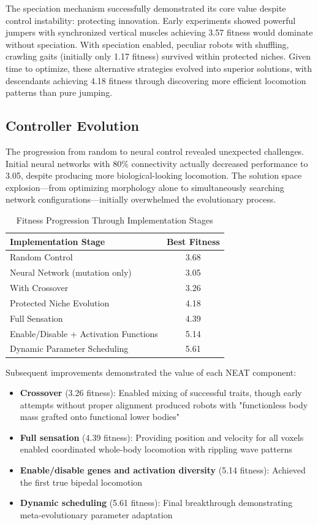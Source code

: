 \documentclass[conference]{IEEEtran}
\begin{document}
The speciation mechanism successfully demonstrated its core value despite control instability: protecting innovation. Early experiments showed powerful jumpers with synchronized vertical muscles achieving 3.57 fitness would dominate without speciation. With speciation enabled, peculiar robots with shuffling, crawling gaits (initially only 1.17 fitness) survived within protected niches. Given time to optimize, these alternative strategies evolved into superior solutions, with descendants achieving 4.18 fitness through discovering more efficient locomotion patterns than pure jumping.

\subsection{Controller Evolution}
The progression from random to neural control revealed unexpected challenges. Initial neural networks with 80\% connectivity actually decreased performance to 3.05, despite producing more biological-looking locomotion. The solution space explosion—from optimizing morphology alone to simultaneously searching network configurations—initially overwhelmed the evolutionary process.

\begin{table}[htbp]
\caption{Fitness Progression Through Implementation Stages}
\label{tab:fitness_progression}
\centering
\begin{tabular}{|l|c|}
\hline
\textbf{Implementation Stage} & \textbf{Best Fitness} \\
\hline
Random Control & 3.68 \\
Neural Network (mutation only) & 3.05 \\
With Crossover & 3.26 \\
Protected Niche Evolution & 4.18 \\
Full Sensation & 4.39 \\
Enable/Disable + Activation Functions & 5.14 \\
Dynamic Parameter Scheduling & 5.61 \\
\hline
\end{tabular}
\end{table}

Subsequent improvements demonstrated the value of each NEAT component:
\begin{itemize}
    \item \textbf{Crossover} (3.26 fitness): Enabled mixing of successful traits, though early attempts without proper alignment produced robots with "functionless body mass grafted onto functional lower bodies"
    \item \textbf{Full sensation} (4.39 fitness): Providing position and velocity for all voxels enabled coordinated whole-body locomotion with rippling wave patterns
    \item \textbf{Enable/disable genes and activation diversity} (5.14 fitness): Achieved the first true bipedal locomotion
    \item \textbf{Dynamic scheduling} (5.61 fitness): Final breakthrough demonstrating meta-evolutionary parameter adaptation
\end{itemize}
\end{document}
